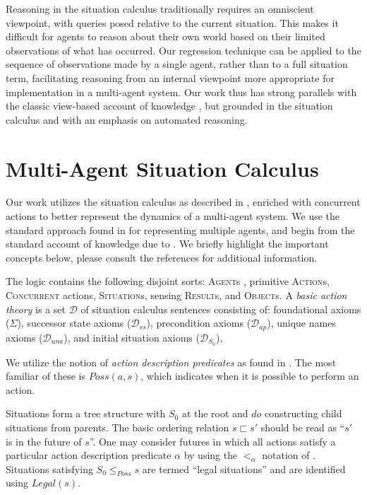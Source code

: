 \documentclass{ifaamas-submission}
\newcommand{\noun}[1]{\textsc{#1}}
\begin{document}
Reasoning in the situation calculus traditionally requires an omniscient
viewpoint, with queries posed relative to the current situation.
This makes it difficult for agents to reason about their
own world based on their limited observations of what has occurred.
Our regression technique can be applied to the sequence of observations
made by a single agent, rather than to a full situation term, facilitating
reasoning from an internal viewpoint more appropriate for implementation
in a multi-agent system. Our work thus has strong parallels with the
classic view-based account of knowledge \cite{halpern90knowledge_distrib},
but grounded in the situation calculus and with an emphasis on automated
reasoning.

\section{Multi-Agent Situation Calculus}

\label{sec:ma-sitcalc}Our work utilizes the situation calculus as
described in \cite{pirri99contributions_sitcalc}, enriched with concurrent
actions \cite{reiter96sc_nat_conc} to better represent the dynamics
of a multi-agent system. We use the standard approach found in \cite{shapiro01casl_feat_inter}
for representing multiple agents, and begin from the standard account
of knowledge due to \cite{scherl03sc_knowledge}. We briefly highlight the important concepts below, please consult the references for additional information.

The logic contains the following disjoint sorts: \noun{Agent}s , primitive \noun{Action}s, \noun{Concurrent}
 actions, \noun{Situation}s, sensing \noun{Result}s, and \noun{Object}s.
A \emph{basic action theory} is a set $\mathcal{D}$ of situation
calculus sentences consisting of: foundational axioms ($\Sigma$), successor
state axioms ($\mathcal{D}_{ss}$), precondition axioms ($\mathcal{D}_{ap}$),
 unique names axioms ($\mathcal{D}_{una}$), and initial situation axioms 
($\mathcal{D}_{S_0}$).

We utilize the notion of \emph{action description predicates} as found in
\cite{kelly07sc_persistence}.  The most familiar of these is $Poss(a,s)$,
which indicates when it is possible to perform an action.

Situations form a tree structure with $S_{0}$ at the root and $do$
constructing child situations from parents. The basic ordering
relation $s\sqsubset s'$ should be read as {}``$s'$ is in
the future of $s$''.
One may consider futures in which all actions
satisfy a particular action description predicate $\alpha$ by using
the $<_{\alpha}$ notation of \cite{kelly07sc_persistence}.  Situations
satisfying $S_0 \leq_{Poss} s$ are termed {}``legal situations'' and
are identified using $Legal(s)$.
\end{document}
